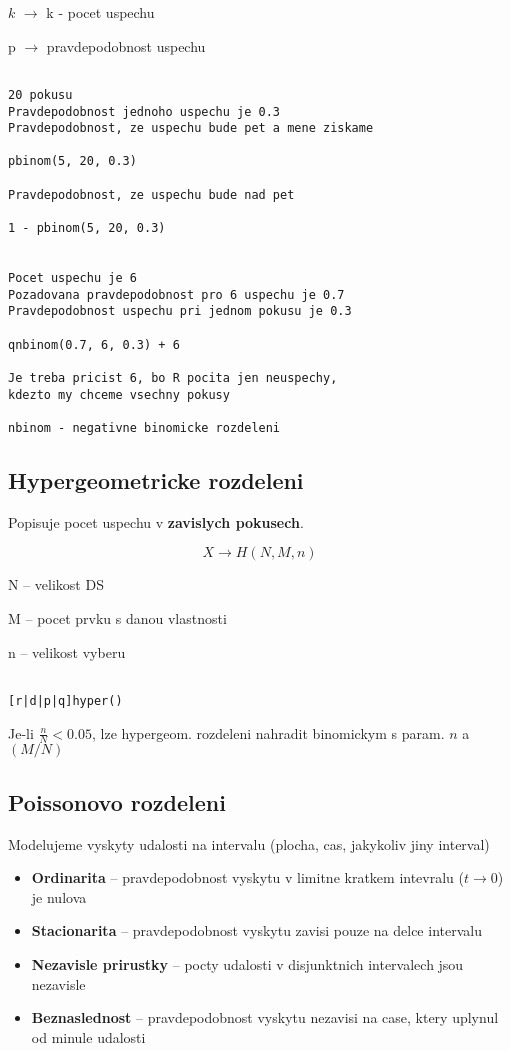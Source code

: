 \documentclass{article}
\begin{document}
$k$ $\rightarrow$ k - pocet uspechu

p $\rightarrow$ pravdepodobnost uspechu


\begin{verbatim}

20 pokusu
Pravdepodobnost jednoho uspechu je 0.3
Pravdepodobnost, ze uspechu bude pet a mene ziskame

pbinom(5, 20, 0.3)

Pravdepodobnost, ze uspechu bude nad pet

1 - pbinom(5, 20, 0.3)


Pocet uspechu je 6
Pozadovana pravdepodobnost pro 6 uspechu je 0.7
Pravdepodobnost uspechu pri jednom pokusu je 0.3

qnbinom(0.7, 6, 0.3) + 6

Je treba pricist 6, bo R pocita jen neuspechy, 
kdezto my chceme vsechny pokusy

nbinom - negativne binomicke rozdeleni

\end{verbatim}

\subsection{Hypergeometricke rozdeleni}

Popisuje pocet uspechu v \textbf{zavislych pokusech}.

\[ X \rightarrow H(N, M, n) \]

N -- velikost DS

M -- pocet prvku s danou vlastnosti

n -- velikost vyberu

\begin{verbatim}

[r|d|p|q]hyper()

\end{verbatim}

Je-li $\frac{n}{N} < 0.05$, lze hypergeom. rozdeleni nahradit binomickym
s param. $n$ a $(M/N)$

\subsection{Poissonovo rozdeleni}

Modelujeme vyskyty udalosti na intervalu (plocha, cas, jakykoliv jiny interval)

\begin{itemize}
    \item \textbf{Ordinarita} -- pravdepodobnost vyskytu v limitne kratkem intevralu ($t \rightarrow 0$) je nulova
    \item \textbf{Stacionarita} -- pravdepodobnost vyskytu zavisi pouze na delce intervalu
    \item \textbf{Nezavisle prirustky} -- pocty udalosti v disjunktnich intervalech jsou nezavisle
    \item \textbf{Beznaslednost} -- pravdepodobnost vyskytu nezavisi na case, ktery uplynul od minule udalosti
\end{itemize}
\end{document}
